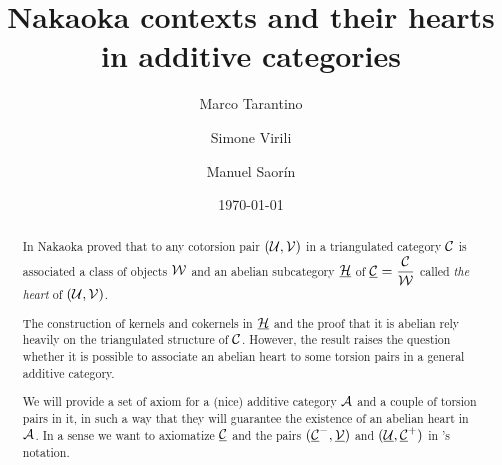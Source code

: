 \documentclass[a4paper]{article}
\title{Nakaoka contexts and their hearts\\ in additive categories}
\author{Marco Tarantino \and
Simone Virili \and
Manuel Saor\'in}
\date{\today}
\theoremstyle{plain}
\theoremstyle{definition}
\theoremstyle{remark}
\begin{document}
\maketitle
\begin{abstract}
  In \cite{nakaoka2011general} Nakaoka proved that to any cotorsion pair $(\mathcal U,\mathcal V)$ in a triangulated category $\mathcal C$ is associated a class of objects $\mathcal W$ and an abelian subcategory $\underline{\mathcal H}$ of  $\underline{\mathcal C}= \dfrac{\mathcal C}{\mathcal W}$ called \emph{the heart} of $(\mathcal U,\mathcal V)$.

  The construction of kernels and cokernels in $\underline{\mathcal H}$ and the proof that it is abelian rely heavily on the triangulated structure of $\mathcal C$. However, the result raises the question whether it is possible to associate an abelian heart to some torsion pairs in a general additive category.

  We will provide a set of axiom for a (nice) additive category $\mathcal A$ and a couple of torsion pairs in it, in such a way that they will guarantee the existence of an abelian heart in $\mathcal A$. In a sense we want to axiomatize $\underline{\mathcal C}$ and the pairs $(\underline{\mathcal C}^-,\underline{\mathcal V})$ and $(\underline{\mathcal U},\underline{\mathcal C}^+)$ in \cite{nakaoka2011general}'s notation.
\end{abstract}

\printbibliography
\end{document}
